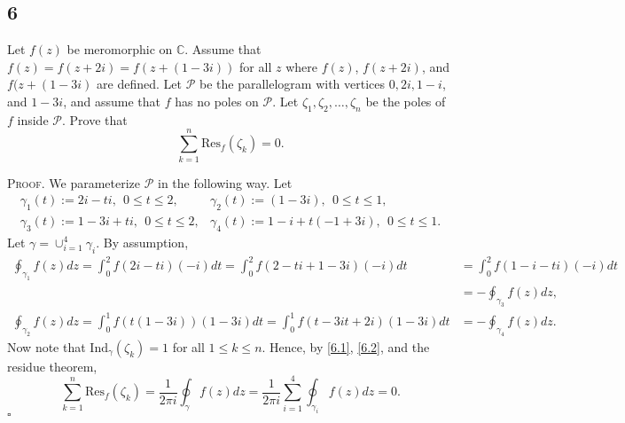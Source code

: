 \documentclass[12pt]{article}
\newcounter{ProofCounter}
\newenvironment{Proof}{\stepcounter{ProofCounter}\textsc{Proof.}}{\hfill$\square$}
\begin{document}
\subsection*{6}
\begin{tcolorbox}
Let $f(z)$ be meromorphic on $\mathbb{C}$. Assume that $f(z) = f(z + 2i) = f(z + (1-3i))$ for all $z$ where $f(z)$, $f(z + 2i)$, and $f(z + (1-3i)$
are defined. Let $\mathcal{P}$ be the parallelogram with vertices $0, 2i, 1- i$, and $1 - 3i$, and assume that $f$ has no poles on $\mathcal{P}$. Let
$\zeta_{1}, \zeta_{2}, \hdots, \zeta_{n}$ be the poles of $f$ inside $\mathcal{P}$. Prove that
\[ \sum_{k=1}^{n}\text{Res}_{f}(\zeta_{k}) = 0. \]
\end{tcolorbox}
\begin{Proof}
We parameterize $\mathcal{P}$ in the following way. Let
\[
\begin{array}{ll}
\gamma_{1}(t) := 2i - ti, \ \  0 \leq t \leq 2, & \gamma_{2}(t) := (1-3i), \ \ 0 \leq t \leq 1, \\
\gamma_{3}(t) := 1 - 3i + ti, \ \ 0 \leq t \leq 2, & \gamma_{4}(t) := 1 - i + t(-1 + 3i), \ \ 0 \leq t \leq 1.
\end{array}
\]
Let $\gamma = \cup_{i=1}^{4}\gamma_{i}$. By assumption,
\begin{align}
\oint_{\gamma_{1}}f(z)dz = \int_{0}^{2}f(2i - ti)(-i)dt = \int_{0}^{2}f(2 - ti + 1 - 3i)(-i)dt & = \int_{0}^{2}f(1 - i -ti)(-i)dt \nonumber \\
& = -\oint_{\gamma_{3}}f(z)dz, \label{6.1} \\
\oint_{\gamma_{2}}f(z)dz = \int_{0}^{1}f(t(1-3i))(1-3i)dt = \int_{0}^{1}f(t - 3it + 2i)(1 - 3i)dt & = -\oint_{\gamma_{4}}f(z)dz. \label{6.2}
\end{align}
Now note that $\text{Ind}_{\gamma}(\zeta_{k}) = 1$ for all $1 \leq k \leq n$. Hence,
by \eqref{6.1}, \eqref{6.2}, and the residue theorem,
\[ \sum_{k=1}^{n}\text{Res}_{f}(\zeta_{k})  = \frac{1}{2\pi i}\oint_{\gamma}f(z)dz = \frac{1}{2\pi i}\sum_{i=1}^{4}\oint_{\gamma_{i}}f(z)dz = 0. \]
\end{Proof}

\newpage
\end{document}
